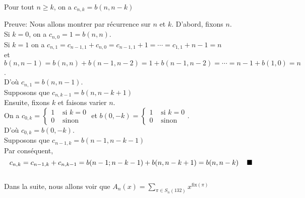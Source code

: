 \begin{proposition}\label{p5}
	Pour tout $n\geq k$, on a $c_{n, k} = b(n, n-k)$
\end{proposition}
Preuve: Nous allons montrer par récurrence sur $n$ et $k$.
D'abord, fixons $n$.\\
Si $k=0$, on a $c_{n, 0}=1=b(n,n)$.\\
Si $k=1$ on a $c_{n,1}=c_{n-1, 1} + c_{n,0}=c_{n-1,1}+1 = \cdots = c_{1,1}+n-1=n$\\
et $b(n, n-1)=b(n,n)+ b(n-1,n-2)=1+b(n-1,n-2)=\cdots=n-1 + b(1,0)=n$. \vspace{5pt}\\
D'où $c_{n,1}=b(n, n-1)$.\vspace{10pt}\\
Supposons que $c_{n, k-1} = b(n, n-k+1)$\\
Ensuite, fixons $k$ et faisons varier $n$.\\
On a $c_{0,k} = \begin{cases}
		1 & \text{ si } k=0 \\
		0 & \text{ sinon }
	\end{cases}$ et
$b(0, -k)=\begin{cases}
		1 & \text{ si } k=0 \\
		0 & \text{ sinon }
	\end{cases}$.\vspace{5pt}\\
D'où $c_{0, k} = b(0, -k)$.\vspace{10pt}\\
Supposons que $c_{n-1, k} = b(n-1, n-k-1)$\vspace{5pt}\\
Par conséquent,
\[
	c_{n, k} = c_{n-1, k}+ c_{n,k-1} = b(n-1; n-k-1) + b(n, n-k+1) = b(n, n-k) \text{ \hspace{5pt} }\blacksquare\]\vspace{10pt}\\
Dans la suite, nous allons voir que $A_{n}(x) = \underset{\pi \in S_{n}(132)}{\sum} x^{\text{fix}(\pi)}$

